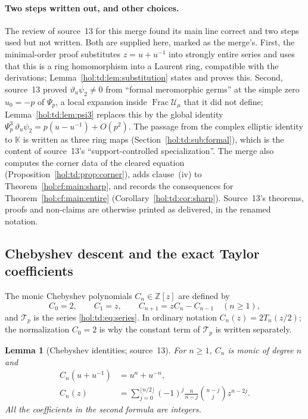 \documentclass[11pt]{article}
\numberwithin{equation}{section}
\newtheorem{lemma}[theorem]{Lemma}
\theoremstyle{definition}
\theoremstyle{remark}
\newcommand{\Z}{\mathbb Z}
\newcommand{\KK}{\mathbb K}
\begin{document}
\paragraph{Two steps written out, and other choices.}
The review of source~13 for this merge found its main line correct and two
steps used but not written. Both are supplied here, marked as the merge's.
First, the minimal-order proof substitutes $z=u+u^{-1}$ into strongly entire
series and uses that this is a ring homomorphism into a Laurent ring,
compatible with the derivations; Lemma~\ref{hol:td:lem:substitution} states
and proves this. Second, source~13 proved $\vartheta_u\psi_2\ne0$ from
``formal meromorphic germs'' at the simple zero $u_0=-p$ of $\Psi_p$, a local
expansion inside $\operatorname{Frac}\mathcal U_\mu$ that it did not define;
Lemma~\ref{hol:td:lem:psi3} replaces this by the global identity
$\Psi_p^3\,\vartheta_u\psi_2=p(u-u^{-1})+O(p^2)$. The passage from the complex
elliptic identity to $\KK$ is written as three ring maps
(Section~\ref{hol:td:sub:formal}), which is the content of source~13's
``support-controlled specialization''. The merge also computes the corner data
of the cleared equation (Proposition~\ref{hol:td:prop:corner}), adds
clause~(iv) to Theorem~\ref{hol:cf:main:sharp}, and records the consequences
for Theorem~\ref{hol:cf:main:entire} (Corollary~\ref{hol:td:cor:sharp}).
Source~13's theorems, proofs and non-claims are otherwise printed as
delivered, in the renamed notation.

\subsection{Chebyshev descent and the exact Taylor coefficients}
\label{hol:td:sub:chebyshev}

The monic Chebyshev polynomials $C_n\in\Z[z]$ are defined by
\begin{equation}\label{hol:td:eq:cheb}
 C_0=2,\qquad C_1=z,\qquad C_{n+1}=zC_n-C_{n-1}\quad(n\ge1),
\end{equation}
and $\mathcal T_p$ is the series \eqref{hol:td:eq:series}. In ordinary
notation $C_n(z)=2T_n(z/2)$; the normalization $C_0=2$ is why the constant
term of $\mathcal T_p$ is written separately.

\begin{lemma}[Chebyshev identities; source~13]\label{hol:td:lem:cheb}
For $n\ge1$, $C_n$ is monic of degree $n$ and
\begin{align}
 C_n(u+u^{-1})&=u^n+u^{-n},\label{hol:td:eq:chebsub}\\
 C_n(z)&=\sum_{j=0}^{\lfloor n/2\rfloor}
 (-1)^j\frac{n}{n-j}\binom{n-j}{j}z^{n-2j}.
 \label{hol:td:eq:chebcoef}
\end{align}
All the coefficients in the second formula are integers.
\end{lemma}
\end{document}
